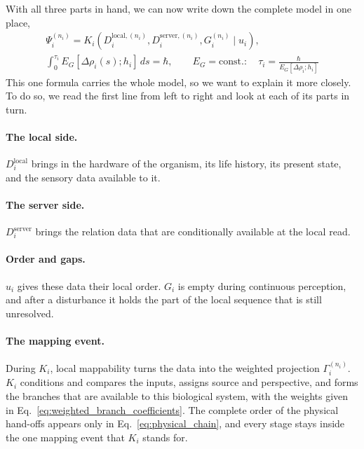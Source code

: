 With all three parts in hand, we can now write down the complete model in one place,
\begin{equation}
  \boxed{
  \begin{gathered}
  \Psi_i^{(n_i)}=
  K_i\!\left(
    D_i^{\mathrm{local},(n_i)},D_i^{\mathrm{server},(n_i)},G_i^{(n_i)}
    \mid u_i
  \right),
  \\
  \displaystyle
  \int_0^{\tau_i}E_G[\Delta\rho_i(s);h_i]\,ds=\hbar,
  \qquad
  E_G=\mathrm{const.}:\quad
  \tau_i=\frac{\hbar}{E_G[\Delta\rho_i;h_i]}
  \end{gathered}}
  \label{eq:core_model}
\end{equation}
This one formula carries the whole model, so we want to explain it more closely. To
do so, we read the first line from left to right and look at each of its parts in
turn.

\paragraph{The local side.}
$D_i^{\mathrm{local}}$ brings in the hardware of the organism, its life history, its
present state, and the sensory data available to it.

\paragraph{The server side.}
$D_i^{\mathrm{server}}$ brings the relation data that are conditionally available at
the local read.

\paragraph{Order and gaps.}
$u_i$ gives these data their local order. $G_i$ is empty during continuous
perception, and after a disturbance it holds the part of the local sequence that is
still unresolved.

\paragraph{The mapping event.}
During $K_i$, local mappability turns the data into the weighted projection
$\Gamma_i^{(n_i)}$. $K_i$ conditions and compares the inputs, assigns source and perspective, and forms
the branches that are available to this biological system, with the weights given in
Eq.~\eqref{eq:weighted_branch_coefficients}. The complete order of the physical
hand-offs appears only in Eq.~\eqref{eq:physical_chain}, and every stage stays inside
the one mapping event that $K_i$ stands for.


